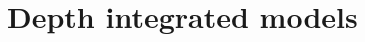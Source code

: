 \documentclass[11pt,a4paper]{article}
\newcommand{\p}{\partial}
\newcommand{\bb}[1]{\boldsymbol{#1}}
\begin{document}



\section{Depth integrated models}



\end{document}
